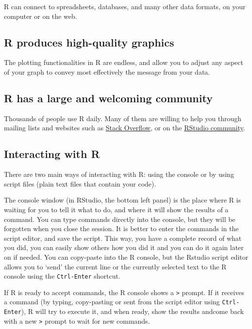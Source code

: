 \documentclass[
]{book}
\begin{document}
R can connect to spreadsheets, databases, and many other data formats, on your computer or on the web.

\subsection*{R produces high-quality graphics}\label{r-produces-high-quality-graphics}

The plotting functionalities in R are endless, and allow you to adjust any aspect of your graph to convey most effectively the message from your data.

\subsection*{R has a large and welcoming community}\label{r-has-a-large-and-welcoming-community}

Thousands of people use R daily. Many of them are willing to help you through mailing lists and websites such as \href{https://stackoverflow.com}{Stack Overflow}, or on the \href{https://community.rstudio.com/}{RStudio community}.

\subsection*{Interacting with R}\label{interacting-with-r}

There are two main ways of interacting with R: using the console or by using
script files (plain text files that contain your code).

The console window (in RStudio, the bottom left panel) is the place where R is waiting for you to tell it what to do, and where it will show the results of a command. You can type commands directly into the console, but they will be forgotten when you close the session. It is better to enter the commands in the script editor, and save the script. This way, you have a complete record of what you did, you can easily show others how you did it and you can do it again later on if needed. You can copy-paste into the R console, but the Rstudio script editor allows you to `send' the current line or the currently selected text to the R console using the \texttt{Ctrl-Enter} shortcut.

If R is ready to accept commands, the R console shows a \texttt{\textgreater{}} prompt. If it receives a command (by typing, copy-pasting or sent from the script editor using \texttt{Ctrl-Enter}), R will try to execute it, and when ready, show the results andcome back with a new \texttt{\textgreater{}} prompt to wait for new commands.
\end{document}
